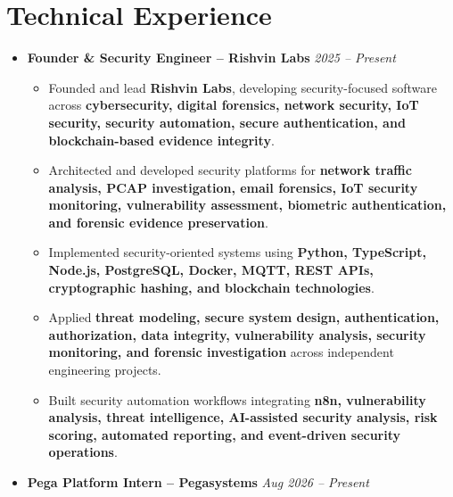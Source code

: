 \documentclass[a4paper,11pt]{article}
\newcommand{\resumeItem}[1]{
    \item \small{#1 \vspace{-2pt}}
}
\begin{document}
\vspace{-10pt}



\section{Technical Experience}

\begin{itemize}[leftmargin=0in, label={}]

\item
\textbf{Founder \& Security Engineer -- Rishvin Labs}
\hfill \textit{2025 -- Present}

\begin{itemize}[leftmargin=*]

\resumeItem{Founded and lead \textbf{Rishvin Labs}, developing security-focused software across \textbf{cybersecurity, digital forensics, network security, IoT security, security automation, secure authentication, and blockchain-based evidence integrity}.}

\resumeItem{Architected and developed security platforms for \textbf{network traffic analysis, PCAP investigation, email forensics, IoT security monitoring, vulnerability assessment, biometric authentication, and forensic evidence preservation}.}

\resumeItem{Implemented security-oriented systems using \textbf{Python, TypeScript, Node.js, PostgreSQL, Docker, MQTT, REST APIs, cryptographic hashing, and blockchain technologies}.}

\resumeItem{Applied \textbf{threat modeling, secure system design, authentication, authorization, data integrity, vulnerability analysis, security monitoring, and forensic investigation} across independent engineering projects.}

\resumeItem{Built security automation workflows integrating \textbf{n8n, vulnerability analysis, threat intelligence, AI-assisted security analysis, risk scoring, automated reporting, and event-driven security operations}.}

\end{itemize}

\vspace{4pt}

\item
\textbf{Pega Platform Intern -- Pegasystems}
\hfill \textit{Aug 2026 -- Present}


\end{itemize}
\end{document}
